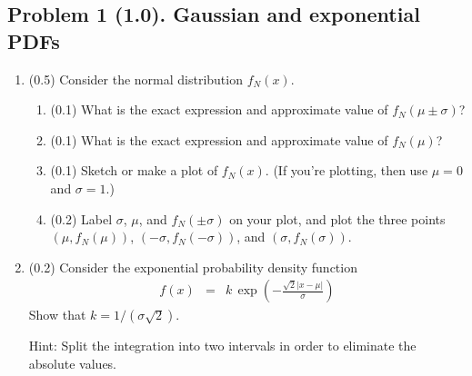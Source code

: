 \documentclass[11pt,titlepage,fleqn]{article}
\begin{document}

\subsection*{Problem 1 (1.0). Gaussian and exponential PDFs}


\begin{enumerate}

\item (0.5) Consider the normal distribution $f_N(x)$.
\begin{enumerate}
\item (0.1) What is the exact expression and approximate value of $f_N(\mu\pm\sigma)$?
\item (0.1) What is the exact expression and approximate value of $f_N(\mu)$?
\item (0.1) Sketch or make a plot of $f_N(x)$. (If you're plotting, then use $\mu = 0$ and $\sigma = 1$.)
\item (0.2) Label $\sigma$, $\mu$, and $f_N(\pm\sigma)$ on your plot, and plot the three points $(\mu,f_N(\mu))$, $(-\sigma,f_N(-\sigma))$, and $(\sigma,f_N(\sigma))$.
\end{enumerate}


\item (0.2) Consider the exponential probability density function
%
\begin{eqnarray}
f(x) &=& k\,\exp\left(-\frac{\sqrt{2}|x - \mu|}{\sigma} \right)
\end{eqnarray}
%
Show that $k = 1/(\sigma\sqrt{2})$.

Hint: Split the integration into two intervals in order to eliminate the absolute values.



\end{enumerate}
\end{document}
